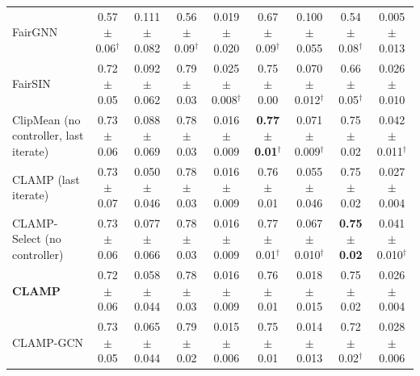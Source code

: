 \begin{table}[t]
{\begin{tabular}{p{2.4cm} cc cc cc cc}
\raggedright FairGNN & 0.57$\pm$0.06$^\dagger$ & 0.111$\pm$0.082 & 0.56$\pm$0.09$^\dagger$ & 0.019$\pm$0.020 & 0.67$\pm$0.09$^\dagger$ & 0.100$\pm$0.055 & 0.54$\pm$0.08$^\dagger$ & 0.005$\pm$0.013 \\
\raggedright FairSIN & 0.72$\pm$0.05 & 0.092$\pm$0.062 & 0.79$\pm$0.03 & 0.025$\pm$0.008$^\dagger$ & 0.75$\pm$0.00 & 0.070$\pm$0.012$^\dagger$ & 0.66$\pm$0.05$^\dagger$ & 0.026$\pm$0.010 \\
\raggedright ClipMean (no controller, last iterate) & 0.73$\pm$0.06 & 0.088$\pm$0.069 & 0.78$\pm$0.03 & 0.016$\pm$0.009 & \textbf{0.77$\pm$0.01}$^\dagger$ & 0.071$\pm$0.009$^\dagger$ & 0.75$\pm$0.02 & 0.042$\pm$0.011$^\dagger$ \\
\raggedright CLAMP (last iterate) & 0.73$\pm$0.07 & 0.050$\pm$0.046 & 0.78$\pm$0.03 & 0.016$\pm$0.009 & 0.76$\pm$0.01 & 0.055$\pm$0.046 & 0.75$\pm$0.02 & 0.027$\pm$0.004 \\
\raggedright CLAMP-Select (no controller) & 0.73$\pm$0.06 & 0.077$\pm$0.066 & 0.78$\pm$0.03 & 0.016$\pm$0.009 & 0.77$\pm$0.01$^\dagger$ & 0.067$\pm$0.010$^\dagger$ & \textbf{0.75$\pm$0.02} & 0.041$\pm$0.010$^\dagger$ \\
\raggedright \textbf{CLAMP} & 0.72$\pm$0.06 & 0.058$\pm$0.044 & 0.78$\pm$0.03 & 0.016$\pm$0.009 & 0.76$\pm$0.01 & 0.018$\pm$0.015 & 0.75$\pm$0.02 & 0.026$\pm$0.004 \\
\raggedright CLAMP-GCN & 0.73$\pm$0.05 & 0.065$\pm$0.044 & 0.79$\pm$0.02 & 0.015$\pm$0.006 & 0.75$\pm$0.01 & 0.014$\pm$0.013 & 0.72$\pm$0.02$^\dagger$ & 0.028$\pm$0.006 \\
\bottomrule
\end{tabular}}
\vspace{4pt}
\end{table}
